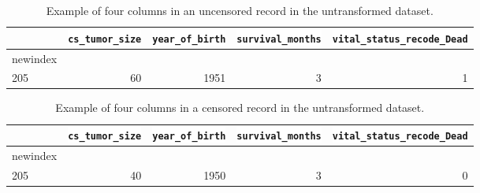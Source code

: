 \documentclass[10pt,letterpaper]{article}
\newcommand{\codewhite}[1]{\colorbox{white}{\texttt{#1}}}
\begin{document}
\begin{table}[!ht]
\begin{adjustwidth}{-2.25in}{0in} %
\caption{\label{tab:originaldead} Example of four columns in an uncensored record in the untransformed dataset.}
\begin{tabular}{lrrrr}
\toprule
{} &  \codewhite{cs\_tumor\_size} &  \codewhite{year\_of\_birth} &  \codewhite{survival\_months} &  \codewhite{vital\_status\_recode\_Dead} \\
\midrule
newindex &                &                &        &            \\
205      &             60 &           1951 &      3 &          1 \\
\bottomrule
\end{tabular}
\end{adjustwidth}
\end{table}



\begin{table}[!ht]
\begin{adjustwidth}{-2.25in}{0in} %
\caption{\label{tab:originalalive} Example of four columns in a censored record in the untransformed dataset.}
\begin{tabular}{lrrrr}
\toprule
{} &  \codewhite{cs\_tumor\_size} &  \codewhite{year\_of\_birth} &  \codewhite{survival\_months} &  \codewhite{vital\_status\_recode\_Dead} \\
\midrule
newindex &                &                &        &            \\
205      &             40 &           1950 &      3 &          0 \\
\bottomrule
\end{tabular}
\end{adjustwidth}
\end{table}
\end{document}
